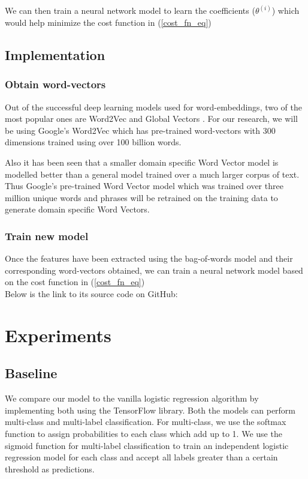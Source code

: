 \noindent We can then train a neural network model to learn the coefficients ($\theta^{(i)}$) which would help minimize the cost function in (\ref{cost_fn_eq})

\section{Implementation}

\subsection{Obtain word-vectors}

Out of the successful deep learning models used for word-embeddings, two of the most popular ones are Word2Vec \cite{le2014distributed} and Global Vectors \cite{pennington2014glove}. For our research, we will be using Google's Word2Vec which has pre-trained word-vectors with 300 dimensions trained using over 100 billion words. 

Also it has been seen that a smaller domain specific Word Vector model is modelled better than a general model trained over a much larger corpus of text. Thus Google's pre-trained Word Vector model which was trained over three million unique words and phrases will be retrained on the training data to generate domain specific Word Vectors.

\subsection{Train new model}

Once the features have been extracted using the bag-of-words model and their corresponding word-vectors obtained, we can train a neural network model based on the cost function in (\ref{cost_fn_eq})\\

\noindent Below is the link to its source code on GitHub:


\chapter{Experiments}

\section{Baseline}

We compare our model to the vanilla logistic regression algorithm by implementing both using the TensorFlow library. Both the models can perform multi-class and multi-label classification. For multi-class, we use the softmax function to assign probabilities to each class which add up to 1. We use the sigmoid function for multi-label classification to train an independent logistic regression model for each class and accept all labels greater than a certain threshold as predictions.

